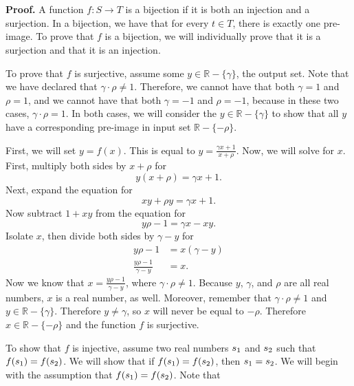 \documentclass[12pt]{exam}
\begin{document}
\begin{questions}
\\
\\\textbf{Proof.} A function $f: S \rightarrow T$ is a bijection if it is both an injection and a surjection. In a bijection, we have that for every $t \in T$, there is exactly one pre-image. To prove that $f$ is a bijection, we will individually prove that it is a surjection and that it is an injection.
\par
To prove that $f$ is surjective, assume some $y \in \mathbb{R} - \{\gamma\}$, the output set. Note that we have declared that $\gamma \cdot \rho \neq 1$. Therefore, we cannot have that both $\gamma = 1$ and $\rho = 1$, and we cannot have that both $\gamma = -1$ and $\rho = -1$, because in these two cases, $\gamma \cdot \rho = 1$. In both cases, we will consider the $y \in \mathbb{R} - \{\gamma\}$ to show that all $y$ have a corresponding pre-image in input set $\mathbb{R} - \{- \rho\}$.
\par
First, we will set $y = f(x)$. This is equal to $y = \frac{\gamma x +1}{x + \rho}$. Now, we will solve for $x$. First, multiply both sides by $x+ \rho$ for
\begin{equation*}
y(x + \rho) = \gamma x +1.
\end{equation*}
Next, expand the equation for 
\begin{equation*}
xy + \rho y = \gamma x +1.
\end{equation*}
Now subtract $1+xy$ from the equation for 
\begin{equation*}
 y\rho -1 = \gamma x -xy.
\end{equation*}
Isolate $x$, then divide both sides by $\gamma - y$ for
\begin{align*}
 y\rho -1 &= x(\gamma -y) \\
 \frac{y\rho -1}{\gamma -y} &= x.
\end{align*}
Now we know that $x= \frac{y\rho -1}{\gamma -y}$, where $\gamma \cdot \rho \neq 1$. Because $y$, $\gamma$, and $\rho$ are all real numbers, $x$ is a real number, as well. Moreover, remember that $\gamma \cdot \rho \neq 1$ and $y \in \mathbb{R} - \{\gamma\}$. Therefore $y \neq \gamma$, so $x$ will never be equal to $-\rho$. Therefore $x \in  \mathbb{R} - \{- \rho\}$ and the function $f$ is surjective.
\par
To show that $f$ is injective, assume two real numbers $s\textsubscript{1}$ and $s\textsubscript{2}$ such that $f(s\textsubscript{1}) = f(s\textsubscript{2})$. We will show that if $f(s\textsubscript{1}) = f(s\textsubscript{2})$, then $s\textsubscript{1} = s\textsubscript{2}$. We will begin with the assumption that $f(s\textsubscript{1}) = f(s\textsubscript{2})$. Note that 

\end{questions}
\end{document}
